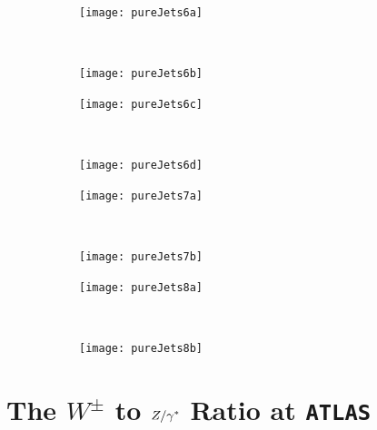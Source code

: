 	\begin{figure}[H]
		\centering
		\begin{subfigure}[b]{0.48\textwidth}
		  \texttt{[image: pureJets6a]}
		  \caption{}
		  \label{fig:}
		\end{subfigure}
		~
		\begin{subfigure}[b]{0.48\textwidth}
		  \texttt{[image: pureJets6b]}
		  \caption{}
		  \label{fig:}
		\end{subfigure}
		\caption{}
		\label{fig:}
	\end{figure}

	\begin{figure}[H]
		\centering
		\begin{subfigure}[b]{0.48\textwidth}
		  \texttt{[image: pureJets6c]}
		  \caption{}
		  \label{fig:}
		\end{subfigure}
		~
		\begin{subfigure}[b]{0.48\textwidth}
		  \texttt{[image: pureJets6d]}
		  \caption{}
		  \label{fig:}
		\end{subfigure}
		\caption{}
		\label{fig:}
	\end{figure}

	\begin{figure}[H]
		\centering
		\begin{subfigure}[b]{0.48\textwidth}
		  \texttt{[image: pureJets7a]}
		  \caption{}
		  \label{fig:}
		\end{subfigure}
		~
		\begin{subfigure}[b]{0.48\textwidth}
		  \texttt{[image: pureJets7b]}
		  \caption{}
		  \label{fig:}
		\end{subfigure}
		\caption{}
		\label{fig:}
	\end{figure}

	\begin{figure}[H]
		\centering
		\begin{subfigure}[b]{0.48\textwidth}
		  \texttt{[image: pureJets8a]}
		  \caption{}
		  \label{fig:}
		\end{subfigure}
		~
		\begin{subfigure}[b]{0.48\textwidth}
		  \texttt{[image: pureJets8b]}
		  \caption{}
		  \label{fig:}
		\end{subfigure}
		\caption{}
		\label{fig:}
	\end{figure}

\chapter{The $W^\pm$ to $Z/\gamma^*$ Ratio at \texttt{ATLAS}}
\label{chap:WZRatio}

